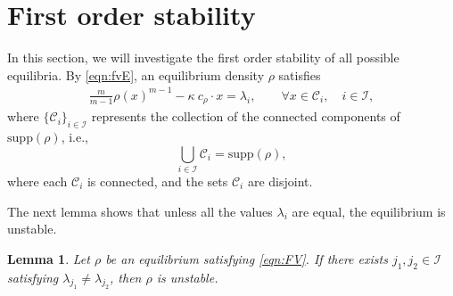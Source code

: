 \documentclass[11pt]{amsart}
\newtheorem{lemma}{Lemma}[section]
\newcommand{\supp}{\mathrm{supp}(\rho)}
\begin{document}
\section{First order stability}
\label{sect:first-order}
In this section, we will investigate the first order stability of all possible equilibria. By \eqref{eqn:fvE}, an equilibrium density $\rho$ satisfies
\begin{align}\label{eqn:FV}
\frac{m}{m-1}\rho(x)^{m-1}-\kappa~ c_\rho\cdot x=\lambda_i,
\qquad
\forall x\in\mathcal{C}_i,\quad i\in\mathcal{I},
\end{align}
where $\{\mathcal{C}_i\}_{i\in\mathcal{I}}$ represents the collection of the connected components of $\supp$, i.e.,
\[
\bigcup_{i\in\mathcal{I}}\mathcal{C}_i=\supp,
\]
where each $\mathcal{C}_i$ is connected, and the sets $\mathcal{C}_i$ are disjoint.

The next lemma shows that unless all the values $\lambda_i$ are equal, the equilibrium is unstable.
\begin{lemma}
\label{lem:constant-lambda}
Let $\rho$ be an equilibrium satisfying \eqref{eqn:FV}. If there exists $j_1,j_2\in\mathcal{I}$ satisfying $\lambda_{j_1}\neq \lambda_{j_2}$, then $\rho$ is unstable.
\end{lemma}
\end{document}
